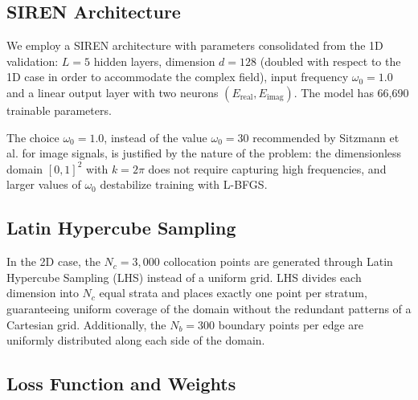 \subsection{SIREN Architecture}
\label{subsec:architecture}

We employ a SIREN architecture with parameters consolidated from the 1D validation:
$L = 5$ hidden layers, dimension $d = 128$ (doubled with respect to the 1D case in
order to accommodate the complex field), input frequency $\omega_0 = 1.0$ and a
linear output layer with two neurons
$(E_{\mathrm{real}}, E_{\mathrm{imag}})$.
The model has 66{,}690 trainable parameters.

The choice $\omega_0 = 1.0$, instead of the value $\omega_0 = 30$ recommended by
Sitzmann et al. \cite{Sitzmann2020_SIREN} for image signals, is justified by the
nature of the problem: the dimensionless domain $[0,1]^2$ with $k = 2\pi$ does not
require capturing high frequencies, and larger values of $\omega_0$ destabilize
training with L-BFGS.

\subsection{Latin Hypercube Sampling}
\label{subsec:lhs}

In the 2D case, the $N_c = 3{,}000$ collocation points are generated through Latin
Hypercube Sampling (LHS) \cite{Mckay1979_LHS} instead of a uniform grid.
LHS divides each dimension into $N_c$ equal strata and places exactly one point per
stratum, guaranteeing uniform coverage of the domain without the redundant patterns
of a Cartesian grid.
Additionally, the $N_b = 300$ boundary points per edge are uniformly distributed
along each side of the domain.

\subsection{Loss Function and Weights}
\label{subsec:loss}

